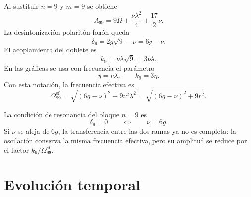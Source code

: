 \documentclass[11pt]{article}
\begin{document}
Al sustituir $n=9$ y $m=9$ se obtiene
\begin{equation}
  \boxed{
  A_{99}
  =
  9\Omega+\frac{\nu\lambda^2}{4}
  +
  \frac{17}{2}\nu.
  }
\end{equation}
La desintonizaci\'on polarit\'on-fon\'on queda
\begin{equation}
  \boxed{
  \delta_9
  =
  2g\sqrt9-\nu
  =
  6g-\nu.
  }
\end{equation}
El acoplamiento del doblete es
\begin{equation}
  \boxed{
  k_9
  =
  \nu\lambda\sqrt9
  =
  3\nu\lambda.
  }
\end{equation}
En las gr\'aficas se usa con frecuencia el par\'ametro
\begin{equation}
  \boxed{
  \eta=\nu\lambda,
  \qquad
  k_9=3\eta.
  }
\end{equation}
Con esta notaci\'on, la frecuencia efectiva es
\begin{equation}
  \boxed{
  \Omega_{99}^{\mathrm{ef}}
  =
  \sqrt{(6g-\nu)^2+9\nu^2\lambda^2}
  =
  \sqrt{(6g-\nu)^2+9\eta^2}.
  }
\end{equation}

La condici\'on de resonancia del bloque $n=9$ es
\begin{equation}
  \boxed{
  \delta_9=0
  \qquad\Longleftrightarrow\qquad
  \nu=6g.
  }
\end{equation}
Si $\nu$ se aleja de $6g$, la transferencia entre las dos ramas ya no es
completa: la oscilaci\'on conserva la misma frecuencia efectiva, pero su
amplitud se reduce por el factor $k_9/\Omega_{99}^{\mathrm{ef}}$.

\section{Evoluci\'on temporal}
\end{document}
